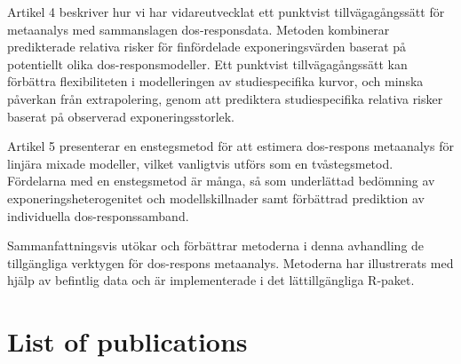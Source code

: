 \documentclass[11pt,a4paper,twoside,openany]{book}\usepackage{knitr}
\makeatletter
\def\cleardoublepage{\clearpage\if@twoside
\ifodd\c@page
\else\hbox{}\thispagestyle{empty}\newpage
\if@twocolumn\hbox{}\newpage\fi\fi\fi}
\makeatother
\begin{document}
{{Artikel 4 beskriver hur vi har vidareutvecklat ett punktvist tillvägagångssätt för metaanalys med sammanslagen dos-responsdata. Metoden kombinerar predikterade relativa risker för finfördelade exponeringsvärden baserat på potentiellt olika dos-responsmodeller. Ett punktvist tillvägagångssätt kan förbättra flexibiliteten i modelleringen av studiespecifika kurvor, och minska påverkan från extrapolering, genom att prediktera studiespecifika relativa risker baserat på observerad exponeringsstorlek. 

Artikel 5 presenterar en enstegsmetod för att estimera dos-respons metaanalys för linjära mixade modeller, vilket vanligtvis utförs som en tvåstegsmetod. Fördelarna med en enstegsmetod är många, så som underlättad bedömning av exponeringsheterogenitet och modellskillnader samt förbättrad prediktion av individuella dos-responssamband. 

Sammanfattningsvis utökar och förbättrar metoderna i denna avhandling de tillgängliga verktygen för dos-respons metaanalys. Metoderna har illustrerats med hjälp av befintlig data och är implementerade i det lättillgängliga R-paket.


\normalsize
\cleardoublepage

%

\chapter*{List of publications}

}}
\end{document}

